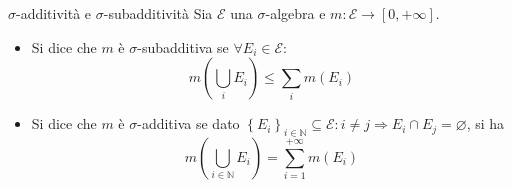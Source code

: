 \documentclass[11pt, a4paper]{scrartcl}
\theoremstyle{definition}
\numberwithin{esempio}{section}
\theoremstyle{definition}
\numberwithin{obs}{section}
\numberwithin{nota}{section}
\numberwithin{equation}{subsection}
\begin{document}
\begin{definizione}
	{$\sigma $-additivit\`a e $\sigma $-subadditivit\`a}{}
	Sia $\mathcal{E} $ una $\sigma $-algebra e $m:\mathcal{E} \to [0,+\infty]$. 
	\begin{itemize}
		\item Si dice che $m$ \`e $\sigma $-subadditiva se $\forall E_i \in \mathcal{E} $:
			\begin{equation*}
				m \left(\bigcup_i E_i\right) \le \sum_{i}^{} m(E_i)
			\end{equation*}
		\item Si dice che $m$ \`e $\sigma $-additiva se dato $\left\{ E_i \right\} _{i \in \mathbb{N}} \subseteq \mathcal{E} : i\neq j\Rightarrow E_i\cap E_j = \varnothing$, si ha
			\begin{equation*}
				m \left(\bigcup_{i\in \mathbb{N}} E_i\right) 	= \sum_{i=1}^{+\infty} m(E_i)
			\end{equation*}
	\end{itemize}
\end{definizione}
\end{document}
